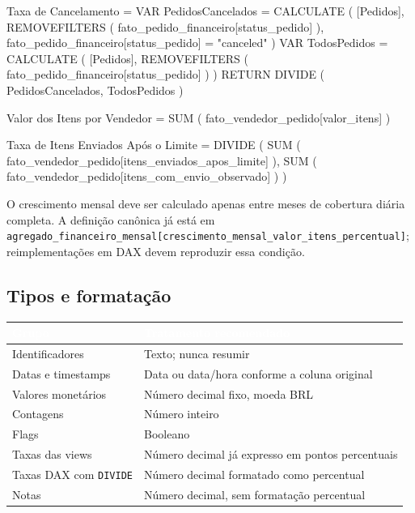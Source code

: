 \documentclass[12pt,a4paper]{article}
\newcounter{none}
\newcommand{\CabecalhoTabela}[1]{\textcolor{white}{\textbf{#1}}}
\newenvironment{Shaded}{}{}
\newcommand{\NormalTok}[1]{#1}
\begin{document}
\begin{Shaded}
\begin{Highlighting}[]
\NormalTok{Taxa de Cancelamento =}
\NormalTok{VAR PedidosCancelados =}
\NormalTok{    CALCULATE (}
\NormalTok{        [Pedidos],}
\NormalTok{        REMOVEFILTERS ( fato\_pedido\_financeiro[status\_pedido] ),}
\NormalTok{        fato\_pedido\_financeiro[status\_pedido] = "canceled"}
\NormalTok{    )}
\NormalTok{VAR TodosPedidos =}
\NormalTok{    CALCULATE (}
\NormalTok{        [Pedidos],}
\NormalTok{        REMOVEFILTERS ( fato\_pedido\_financeiro[status\_pedido] )}
\NormalTok{    )}
\NormalTok{RETURN}
\NormalTok{    DIVIDE ( PedidosCancelados, TodosPedidos )}

\NormalTok{Valor dos Itens por Vendedor =}
\NormalTok{SUM ( fato\_vendedor\_pedido[valor\_itens] )}

\NormalTok{Taxa de Itens Enviados Após o Limite =}
\NormalTok{DIVIDE (}
\NormalTok{    SUM ( fato\_vendedor\_pedido[itens\_enviados\_apos\_limite] ),}
\NormalTok{    SUM ( fato\_vendedor\_pedido[itens\_com\_envio\_observado] )}
\NormalTok{)}
\end{Highlighting}
\end{Shaded}

O crescimento mensal deve ser calculado apenas entre meses de cobertura
diária completa. A definição canônica já está em
\nolinkurl{agregado_financeiro_mensal[crescimento_mensal_valor_itens_percentual]};
reimplementações em DAX devem reproduzir essa condição.

\subsection{Tipos e
formatação}\label{docs__analytics__consumo_power_bi_sql.md__tipos-e-formatauxe7uxe3o}

{\def\LTcaptype{none} %
\begin{longtable}[]{@{}ll@{}}
\toprule\noalign{}
\rowcolor{AzulCorporativo}
\CabecalhoTabela{Grupo} & \CabecalhoTabela{Tratamento recomendado} \\
\midrule\noalign{}
\endhead
\bottomrule\noalign{}
\endlastfoot
Identificadores & Texto; nunca resumir \\
Datas e timestamps & Data ou data/hora conforme a coluna original \\
Valores monetários & Número decimal fixo, moeda BRL \\
Contagens & Número inteiro \\
Flags & Booleano \\
Taxas das views & Número decimal já expresso em pontos percentuais \\
Taxas DAX com \nolinkurl{DIVIDE} & Número decimal formatado como
percentual \\
Notas & Número decimal, sem formatação percentual \\
\end{longtable}
}
\end{document}
